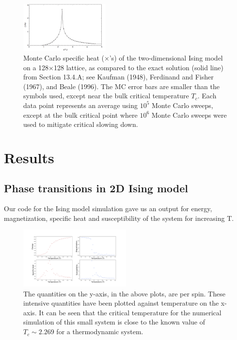 \documentclass[5p,authoryear]{elsarticle}
\begin{document}
\begin{figure}[h]
  \centering
  \includegraphics[width=0.4\textwidth]{1.png}
  \caption{Monte Carlo specific heat (×’s) of the two-dimensional Ising model on a 128×128 lattice, as compared to the exact solution (solid line) from Section 13.4.A; see Kaufman (1948), Ferdinand and Fisher (1967), and Beale (1996). The MC error bars are smaller than the symbols used, except near the bulk critical temperature $T_{c}$. Each data point represents an average using $10^5$ Monte Carlo sweeps, except at the bulk critical point where $10^6$ Monte Carlo sweeps were used to mitigate critical slowing down.}
\end{figure}

\section{Results}

\subsection{Phase transitions in 2D Ising model}
 Our code for the Ising model simulation gave us an output for energy, magnetization, specific heat and susceptibility of the system for increasing T.

 \begin{figure}[h]
   \centering
   \includegraphics[width=0.5\textwidth]{Phase_transition.pdf}
   \caption{The quantities on the y-axis, in the above plots, are per spin. These intensive quantities have been plotted against temperature on the x-axis. It can be seen that the critical temperature for the numerical simulation of this small system is close to the known value of $T_c \sim 2.269$ for a thermodynamic system.}
 \end{figure}
\end{document}
